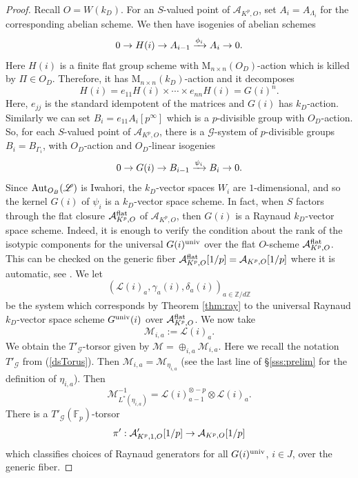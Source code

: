 \documentclass[reqno, 10pt]{amsart}
\makeatletter
\newcommand{\sL}{\ensuremath{\mathscr{L}}\xspace}
\newcommand{\BF}{\ensuremath{\mathbb {F}}\xspace}
\newcommand{\BZ}{\ensuremath{\mathbb {Z}}\xspace}
\newcommand{\CA}{\ensuremath{\mathcal {A}}\xspace}
\newcommand{\CG}{\ensuremath{\mathcal {G}}\xspace}
\newcommand{\CL}{\ensuremath{\mathcal {L}}\xspace}
\newcommand{\CM}{\ensuremath{\mathcal {M}}\xspace}
\newcommand{\RM}{\ensuremath{\mathrm {M}}\xspace}
\theoremstyle{definition}
\numberwithin{equation}{subsection}
\numberwithin{subsubsection}{subsection}
\renewcommand{\to}{%
   \ifbool{@display}{\longrightarrow}{\rightarrow}%
   }
\makeatother
\begin{document}
\begin{proof}
 Recall $O=W(k_D)$. For an $S$-valued point of $\CA_{K^p,O}$, set $A_{i}=A_{\Lambda_{i}}$ for the corresponding abelian scheme.  We then have isogenies of abelian schemes
 \[
 0\to H(i)\to A_{i-1}\xrightarrow{\phi_i} A_i\to 0.
 \]
 Here $H(i)$ is a finite flat group scheme with $\RM_{n\times n}(O_D)$-action which is killed by $\Pi\in O_D$. Therefore, 
 it has $\RM_{n\times n}(k_D)$-action and it decomposes
 \[
 H(i)   =e_{11}H(i)\times\cdots \times e_{nn}H(i)=G(i)^n.
 \]
Here, $e_{jj}$ is the standard idempotent of the matrices and  $G(i)$ has $k_D$-action. Similarly we can set $B_i=e_{11}A_i[p^\infty]$ which is a $p$-divisible group with $O_D$-action. So, for each $S$-valued point of $\CA_{K^p,O}$, 
 there is a $\mathscr G$-system of $p$-divisible groups $B_i=B_{\Gamma_i}$,
  with $O_D$-action and $O_D$-linear isogenies
  \begin{equation}\label{isogp}
  0\to G(i)\to  B_{i-1}\xrightarrow{\psi_i} B_i\to 0 .
  \end{equation}
Since ${\rm Aut}_{O_B}(\sL)$ is Iwahori, the $k_D$-vector spaces $W_i$ are $1$-dimensional, and so the kernel $G(i)$  of $\psi_i$ is a $k_D$-vector space scheme.
 In fact,  when $S$ factors through the flat closure $\CA^{\rm flat}_{K^p,O}$ of $\CA_{K^p,O}$, then $G(i)$ is a Raynaud $k_D$-vector space scheme. Indeed, it is enough to verify the condition about the rank of the isotypic components  for the universal $G(i)^{\rm univ}$ over the flat $O$-scheme $\CA^{\rm flat}_{K^p,O}$. This can be checked on the generic fiber $\CA^{\rm flat}_{K^p,O}[1/p]=\CA_{K^p,O}[1/p]$ where it is automatic, see \cite[Prop. 1.2.2]{Ray}.
We let 
\[
(\CL(i)_a, \gamma_a(i), \delta_a(i))_{a\in \BZ/d\BZ}
\]
 be the system which corresponds by Theorem \ref{thm:ray} to the universal  
Raynaud $k_D$-vector space scheme  $G^{\rm univ}(i)$ over  $\CA^{\rm flat}_{K^p, O}$.
We now take  
\[
 \CM_{i,a}:=\CL(i)_a. 
\]
We obtain the $T'_{\CG}$-torsor given by $\CM=\oplus_{i, a}\CM_{i, a}$. Here we recall the notation $T'_{\CG}$ from
 (\ref{dsTorus}). Then $\CM_{i, a}=\CM_{\eta_{i, a}}$ (see the last line of \S \ref{sss:prelim} for the definition of $\eta_{i, a}$).
Then
 \[
  \CM^{-1}_{L^*(\eta_{i,a})} =\CL(i)_{a-1}^{\otimes -p}\otimes \CL(i)_{a}.
 \]
 There is a $T'_{\CG}(\BF_p)$-torsor  
 \begin{equation}\label{pi1A}
\pi':  \CA'_{K^p, 1, O}[1/p]\to \CA_{K^p,O}[1/p]
 \end{equation}
 which classifies choices of Raynaud generators for all $G(i)^{\rm univ}$, $i\in J$, over the generic fiber. 
 

\end{proof}
\end{document}
